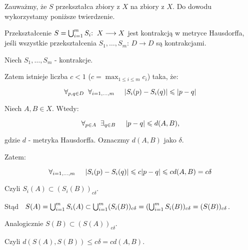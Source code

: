\documentclass{mini}
\begin{document}

 


\begin{dow1}

Zauważmy, że $S$ przekształca zbiory z $X$ na zbiory z $X$.
Do dowodu wykorzystamy poniższe twierdzenie.

\begin{tw}\label{tp1}

Przekształcenie 
$S=\bigcup^{m}_{i=1} S_i \textrm{:} \hspace{2mm} X\longrightarrow X$
jest kontrakcją w metryce Hausdorffa, jeśli wszystkie przekształcenia
$S_1,\ldots ,S_m$: $D \longrightarrow D$
są kontrakcjami.

\end{tw}

\begin{dow}

Niech $S_1,\ldots ,S_m$ - kontrakcje.

Zatem istnieje liczba $c<1$ ($c=\max_{1\leqslant i\leqslant m}{c_i}$) taka, że:

$$ \forall_{p,q \in D} \hspace{2mm} \forall_{i=1,\ldots ,m} \hspace{5mm} \vert S_i(p)-S_i(q)\vert \leqslant \vert p-q \vert $$

Niech $A,B \in X$. Wtedy:

$$ \forall_{p \in A} \hspace{2mm} \exists_{q \in B} \hspace{5mm} \vert p-q \vert \leqslant d(A,B) \textrm{,}$$

gdzie $d$ - metryka Hausdorffa. Oznaczmy $d(A,B)$ jako $\delta$.

Zatem:

$$\forall_{i=1,\ldots ,m} \hspace{5mm} \vert S_i(p)-S_i(q) \vert \leqslant c \vert p-q \vert \leqslant cd(A,B)=c\delta$$

Czyli $S_i(A) \subset (S_i(B))_{c\delta}$.

Stąd 
$ \hspace{2mm} S(A)=\bigcup^{m}_{i=1} S_i(A) \subset \bigcup^{m}_{i=1} (S_i(B))_{c\delta} = (\bigcup^{m}_{i=1} S_i(B))_{c\delta} = (S(B))_{c\delta}  $.

Analogicznie 
$S(B) \subset (S(A))_{c\delta}$.

Czyli $d(S(A),S(B))\leqslant c\delta = cd(A,B)$.


\end{dow}
\end{dow1}
\end{document}
